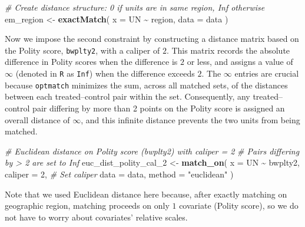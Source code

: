 \documentclass[
  12pt,
  leqno]{article}
\newenvironment{Shaded}{\begin{snugshade}}{\end{snugshade}}
\newcommand{\AttributeTok}[1]{\textcolor[rgb]{0.13,0.29,0.53}{#1}}
\newcommand{\CommentTok}[1]{\textcolor[rgb]{0.56,0.35,0.01}{\textit{#1}}}
\newcommand{\DecValTok}[1]{\textcolor[rgb]{0.00,0.00,0.81}{#1}}
\newcommand{\FunctionTok}[1]{\textcolor[rgb]{0.13,0.29,0.53}{\textbf{#1}}}
\newcommand{\NormalTok}[1]{#1}
\newcommand{\OtherTok}[1]{\textcolor[rgb]{0.56,0.35,0.01}{#1}}
\newcommand{\SpecialCharTok}[1]{\textcolor[rgb]{0.81,0.36,0.00}{\textbf{#1}}}
\newcommand{\StringTok}[1]{\textcolor[rgb]{0.31,0.60,0.02}{#1}}
\begin{document}
\singlespacing

\begin{Shaded}
\begin{Highlighting}[]
\CommentTok{\# Create distance structure: 0 if units are in same region, Inf otherwise}
\NormalTok{em\_region }\OtherTok{\textless{}{-}} \FunctionTok{exactMatch}\NormalTok{(}
  \AttributeTok{x =}\NormalTok{ UN }\SpecialCharTok{\textasciitilde{}}\NormalTok{ region,}
  \AttributeTok{data =}\NormalTok{ data}
\NormalTok{)}
\end{Highlighting}
\end{Shaded}

\doublespacing

Now we impose the second constraint by constructing a distance matrix
based on the Polity score, \texttt{bwplty2}, with a caliper of \(2\).
This matrix records the absolute difference in Polity scores when the
difference is \(2\) or less, and assigns a value of \(\infty\) (denoted
in \texttt{R} as \texttt{Inf}) when the difference exceeds \(2\). The
\(\infty\) entries are crucial because \texttt{optmatch} minimizes the
sum, across all matched sets, of the distances between each
treated--control pair within the set. Consequently, any treated--control
pair differing by more than 2 points on the Polity score is assigned an
overall distance of \(\infty\), and this infinite distance prevents the
two units from being matched.

\singlespacing

\begin{Shaded}
\begin{Highlighting}[]
\CommentTok{\# Euclidean distance on Polity score (bwplty2) with caliper = 2}
\CommentTok{\# Pairs differing by \textgreater{} 2 are set to Inf}
\NormalTok{euc\_dist\_polity\_cal\_2 }\OtherTok{\textless{}{-}} \FunctionTok{match\_on}\NormalTok{(}
  \AttributeTok{x =}\NormalTok{ UN }\SpecialCharTok{\textasciitilde{}}\NormalTok{ bwplty2,}
  \AttributeTok{caliper =} \DecValTok{2}\NormalTok{,  }\CommentTok{\# Set caliper}
  \AttributeTok{data =}\NormalTok{ data,}
  \AttributeTok{method =} \StringTok{"euclidean"}
\NormalTok{)}
\end{Highlighting}
\end{Shaded}

\doublespacing

Note that we used Euclidean distance here because, after exactly
matching on geographic region, matching proceeds on only \(1\) covariate
(Polity score), so we do not have to worry about covariates' relative
scales.
\end{document}
